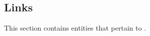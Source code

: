 \documentclass[10pt,twoside,english,pdftex]{article}
\begin{document}

\W\renewcommand{\subsubentities}{1}

\T\markright{}%
\T\pagestyle{plain}
\T\clearpage
\W{}
\T\pagestyle{fancy}
\T\thispagestyle{fancybottom}
\T\global\def\fnlastname{ }%

\subsection{Links}
\label{sec:links}%

This section contains  entities that pertain to
.

\end{document}
